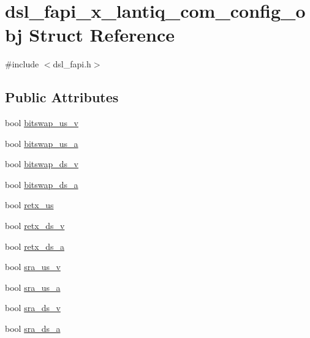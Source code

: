 \hypertarget{structdsl__fapi__x__lantiq__com__config__obj}{\section{dsl\-\_\-fapi\-\_\-x\-\_\-lantiq\-\_\-com\-\_\-config\-\_\-obj Struct Reference}
\label{structdsl__fapi__x__lantiq__com__config__obj}
}


{\ttfamily \#include $<$dsl\-\_\-fapi.\-h$>$}

\subsection*{Public Attributes}
\begin{DoxyCompactItemize}
\item 
bool \hyperlink{structdsl__fapi__x__lantiq__com__config__obj_a95dbacbdd804a3d90d472cb66d6980d0}{bitswap\-\_\-us\-\_\-v}
\item 
bool \hyperlink{structdsl__fapi__x__lantiq__com__config__obj_a0c0f55d074b84a3d28caa3973ef1bef9}{bitswap\-\_\-us\-\_\-a}
\item 
bool \hyperlink{structdsl__fapi__x__lantiq__com__config__obj_adb7c968724b7a3c6a75d3a93ce3b4403}{bitswap\-\_\-ds\-\_\-v}
\item 
bool \hyperlink{structdsl__fapi__x__lantiq__com__config__obj_ad6bb2f5e64af8a45c8b7e76b51e7fae4}{bitswap\-\_\-ds\-\_\-a}
\item 
bool \hyperlink{structdsl__fapi__x__lantiq__com__config__obj_a9b9b96db0accb1173f4b31060b1ecbc4}{retx\-\_\-us}
\item 
bool \hyperlink{structdsl__fapi__x__lantiq__com__config__obj_a3f2204e4f2999f9f8ec7dfc0a0cb5975}{retx\-\_\-ds\-\_\-v}
\item 
bool \hyperlink{structdsl__fapi__x__lantiq__com__config__obj_af64c2d5f79e7b40504a38b1ba0550766}{retx\-\_\-ds\-\_\-a}
\item 
bool \hyperlink{structdsl__fapi__x__lantiq__com__config__obj_a1a825689261e4fdba5c9c53120885d03}{sra\-\_\-us\-\_\-v}
\item 
bool \hyperlink{structdsl__fapi__x__lantiq__com__config__obj_ad3c82e31f489873e748481dc01c41c14}{sra\-\_\-us\-\_\-a}
\item 
bool \hyperlink{structdsl__fapi__x__lantiq__com__config__obj_aaa5b8cac570ec37513c336382c15a55a}{sra\-\_\-ds\-\_\-v}
\item 
bool \hyperlink{structdsl__fapi__x__lantiq__com__config__obj_a179dd89ab13693380c0f63cbec6aeeb8}{sra\-\_\-ds\-\_\-a}

\end{DoxyCompactItemize}
